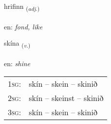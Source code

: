 \documentclass[frontgrid, backgrid]{flacards}\usepackage[]{graphicx}\usepackage[]{xcolor}
\begin{document}
\renewcommand{\flhead}{\vskip5pt \fboxsep=0pt {\small\bfseries\footnotesize Lýsingarorð | Adjective}}
\renewcommand{\fcfoot}{\vskip5pt \fboxsep=0pt \hspace{2pt}{\small\bfseries\footnotesize 3K}}

\renewcommand{\blhead}{\vskip5pt {\small\bfseries\footnotesize Lýsingarorð | Adjective }}
\renewcommand{\bcfoot}{\vskip5pt \hspace{2pt}{\small\bfseries\footnotesize 3K}}


{hrifinn \small{\textsubscript{(\textit{adj.})}} \\[1ex] %
\textphonetic{[r̥ɪːvɪn]} \\
en: \emph{fond, like} \\  [2ex]
\renewcommand*{\arraystretch}{0.8}
}

\renewcommand{\flhead}{\vskip5pt \fboxsep=0pt {\small\bfseries\footnotesize Sagnorð | Verb}}
\renewcommand{\fcfoot}{\vskip5pt \fboxsep=0pt \hspace{2pt}{\small\bfseries\footnotesize 3K}}

\renewcommand{\blhead}{\vskip5pt {\small\bfseries\footnotesize Sagnorð | Verb }}
\renewcommand{\bcfoot}{\vskip5pt \hspace{2pt}{\small\bfseries\footnotesize 3K}}


{skína \small{\textsubscript{(\textit{v.})}} \\[1ex] %
\textphonetic{[sciːna]} \\
en: \emph{shine} \\  [2ex]
\renewcommand*{\arraystretch}{0.8}
\begin{tabular}{p{1cm}l}
\textsc{1sg}: & skín -- skein -- skinið \\ 
\textsc{2sg}: & skín -- skeinst -- skinið \\ 
\textsc{3sg}: & skín -- skein -- skinið \\ 
\end{tabular}
}
\end{document}
